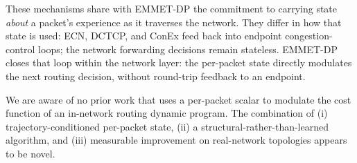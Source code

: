These mechanisms share with EMMET-DP the commitment to carrying
state \emph{about} a packet's experience as it traverses the
network. They differ in how that state is used: ECN, DCTCP, and
ConEx feed back into endpoint congestion-control loops; the
network forwarding decisions remain stateless. EMMET-DP closes
that loop within the network layer: the per-packet state directly
modulates the next routing decision, without round-trip feedback
to an endpoint.

We are aware of no prior work that uses a per-packet scalar to
modulate the cost function of an in-network routing dynamic
program. The combination of (i) trajectory-conditioned per-packet
state, (ii) a structural-rather-than-learned algorithm, and
(iii) measurable improvement on real-network topologies appears
to be novel.
